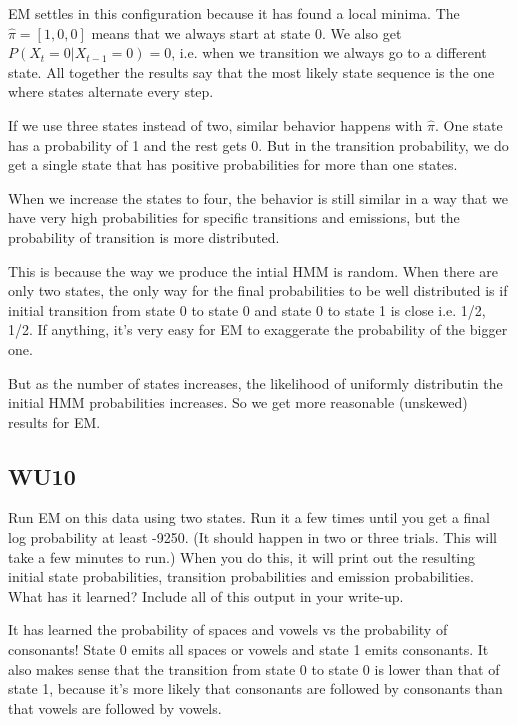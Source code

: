 \documentclass[a4paper,11pt]{article}
\begin{document}
EM settles in this configuration because it has found a local minima. The
$\hat \pi = [1,0,0]$ means that we always start at state 0. We also get $P(X_t=0|X_{t-1}=0)= 0$,
i.e. when we transition we always go to a different state. All
together the results say that the most likely state sequence is the
one where states alternate every step.

If we use three states instead of two, similar behavior happens with
$\hat \pi$. One state has a probability of 1 and the rest gets 0. But
in the transition probability, we do get a single state that
has positive probabilities for more than one states.

When we increase the states to four, the behavior is still similar in
a way that we have very high probabilities for specific transitions
and emissions, but the probability of transition is more distributed.

This is because the way we produce the intial HMM is random. When
there are only two states, the only way for the final probabilities to
be well distributed is if initial transition from state 0 to state 0
and state 0 to state 1 is close i.e. 1/2, 1/2. If anything, it's very
easy for EM to exaggerate the probability of the bigger one.

But as the number of states increases, the likelihood of uniformly
distributin the initial HMM probabilities increases. So we get more
reasonable (unskewed) results for EM.

\pagebreak
\subsection{WU10}
\textsf{Run EM on this data using two states. 
Run it a few times until you get a final log probability at least -9250. 
(It should happen in two or three trials. This will take a few minutes to run.) 
When you do this, it will print out the resulting initial state probabilities, 
transition probabilities and emission probabilities. 
What has it learned? Include all of this output in your
write-up.}\vspace{0.1in}

It has learned the probability of spaces and vowels vs the probability
of consonants! State 0 emits all spaces or vowels and state 1 emits
consonants. It also makes sense that the transition from state 0 to
state 0 is lower than that of state 1, because it's more likely that
consonants are followed by consonants than that vowels are followed by vowels.
\end{document}
